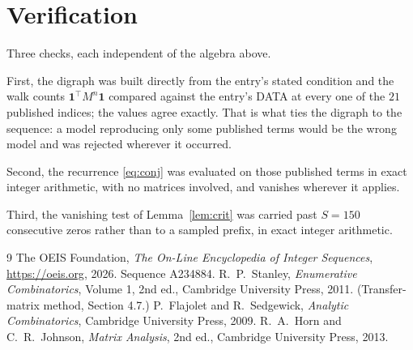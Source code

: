 \documentclass[11pt,a4paper]{article}
\theoremstyle{plain}
\theoremstyle{definition}
\begin{document}
\section{Verification}

Three checks, each independent of the algebra above.

First, the digraph was built directly from the entry's stated condition and the walk counts
$\mathbf{1}^{\!\top}M^{n}\mathbf{1}$ compared against the entry's DATA at every one of
the $21$ published indices; the values agree exactly. That is what ties the digraph to
the sequence: a model reproducing only some published terms would be the wrong model and
was rejected wherever it occurred.

Second, the recurrence \eqref{eq:conj} was evaluated on those published terms in exact
integer arithmetic, with no matrices involved, and vanishes wherever it applies.

Third, the vanishing test of Lemma~\ref{lem:crit} was carried past $S=150$ consecutive
zeros rather than to a sampled prefix, in exact integer arithmetic.

\begin{thebibliography}{9}
 The OEIS Foundation, \emph{The On-Line Encyclopedia of Integer
Sequences}, \url{https://oeis.org}, 2026. Sequence A234884.
 R.~P.~Stanley, \emph{Enumerative Combinatorics}, Volume 1, 2nd ed.,
Cambridge University Press, 2011. (Transfer-matrix method, Section 4.7.)
 P.~Flajolet and R.~Sedgewick, \emph{Analytic Combinatorics}, Cambridge
University Press, 2009.
 R.~A.~Horn and C.~R.~Johnson, \emph{Matrix Analysis}, 2nd ed., Cambridge
University Press, 2013.
\end{thebibliography}
\end{document}
